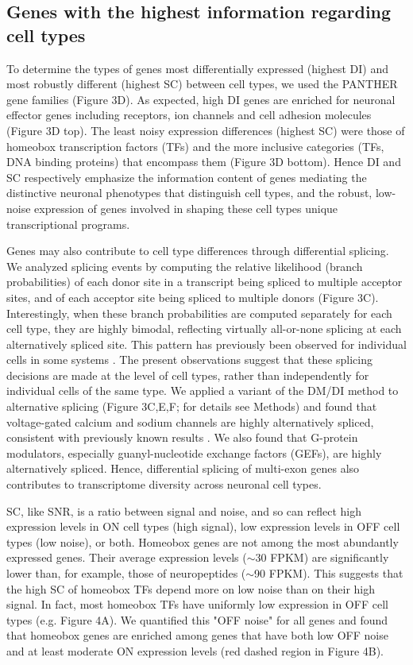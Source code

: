 \subsection{Genes with the highest information regarding cell types}
To determine the types of genes most differentially expressed (highest DI) and most robustly different (highest SC) between cell types, we used the PANTHER \citep{Thomas_2003} gene families (Figure 3D). As expected, high DI genes are enriched for neuronal effector genes including receptors, ion channels and cell adhesion molecules (Figure 3D top). The least noisy expression differences (highest SC) were those of homeobox transcription factors (TFs) and the more inclusive categories (TFs, DNA binding proteins) that encompass them (Figure 3D bottom). Hence DI and SC respectively emphasize the information content of genes  mediating the distinctive neuronal phenotypes that distinguish cell types, and the robust, low-noise expression of genes involved in shaping these cell types unique transcriptional programs.

Genes may also contribute to cell type differences through differential splicing. We analyzed splicing events by computing the relative likelihood (branch probabilities) of each donor site in a transcript being spliced to multiple acceptor sites, and of each acceptor site being spliced to multiple donors (Figure 3C). Interestingly, when these branch probabilities are computed separately for each cell type, they are highly bimodal, reflecting virtually all-or-none splicing at each alternatively spliced site. This pattern has previously been observed for individual cells in some systems \citep{Shalek_2013}. The present observations suggest that these splicing decisions are made at the level of cell types, rather than independently for individual cells of the same type. We applied a variant of the DM/DI method to alternative splicing (Figure 3C,E,F; for details see Methods) and found that voltage-gated calcium and sodium channels are highly alternatively spliced, consistent with previously known results \citep[e.g.][]{Lipscombe_2013}. We also found that G-protein modulators, especially guanyl-nucleotide exchange factors (GEFs), are highly alternatively spliced. Hence, differential splicing of multi-exon genes also contributes to transcriptome diversity across neuronal cell types.

SC, like SNR, is a ratio between signal and noise, and so can reflect high expression levels in ON cell types (high signal), low expression levels in OFF cell types (low noise), or both. Homeobox genes are not among the most abundantly expressed genes. Their average expression levels ($\sim$30 FPKM) are significantly lower than, for example, those of neuropeptides ($\sim$90 FPKM). This suggests that the high SC of homeobox TFs depend more on low noise than on their high signal. In fact, most homeobox TFs have uniformly low expression in OFF cell types (e.g. Figure 4A). We quantified this "OFF noise" for all genes and found that homeobox genes are enriched among genes that have both low OFF noise and at least moderate ON expression levels (red dashed region in Figure 4B).


